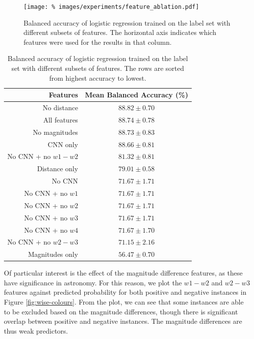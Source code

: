     \begin{figure}
      \centering
      \texttt{[image: \%
        images/experiments/feature\_ablation.pdf]}
      \caption{Balanced accuracy of logistic regression trained on the
        \citeauthor{norris06} label set with different subsets of features. The
        horizontal axis indicates which features were used for the results in
        that column.}
      \label{fig:feature-ablation}
    \end{figure}

    \begin{table}
      \centering
      \begin{tabular}{r|c}
        \textbf{Features} & \textbf{Mean Balanced Accuracy (\%)}\\\hline
        No distance & $88.82 \pm 0.70$\\
        All features & $88.74 \pm 0.78$\\
        No magnitudes & $88.73 \pm 0.83$\\
        CNN only & $88.66 \pm 0.81$\\
        No CNN + no $w1 - w2$ & $81.32 \pm 0.81$\\
        Distance only & $79.01 \pm 0.58$\\
        No CNN & $71.67 \pm 1.71$\\
        No CNN + no $w1$ & $71.67 \pm 1.71$\\
        No CNN + no $w2$ & $71.67 \pm 1.71$\\
        No CNN + no $w3$ & $71.67 \pm 1.71$\\
        No CNN + no $w4$ & $71.67 \pm 1.70$\\
        No CNN + no $w2 - w3$ & $71.15 \pm 2.16$\\
        Magnitudes only & $56.47 \pm 0.70$\\
      \end{tabular}
      \caption{Balanced accuracy of logistic regression trained on the
        \citeauthor{norris06} label set with different subsets of features. The
        rows are sorted from highest accuracy to lowest.}
      \label{tab:feature-ablation}
    \end{table}

    Of particular interest is the effect of the magnitude difference features,
    as these have significance in astronomy. For this reason, we plot the $w1 -
    w2$ and $w2 - w3$ features against predicted probability for both positive
    and negative instances in Figure \ref{fig:wise-colours}. From the plot, we
    can see that some instances are able to be excluded based on the magnitude
    differences, though there is significant overlap between positive and
    negative instances. The magnitude differences are thus weak predictors.

